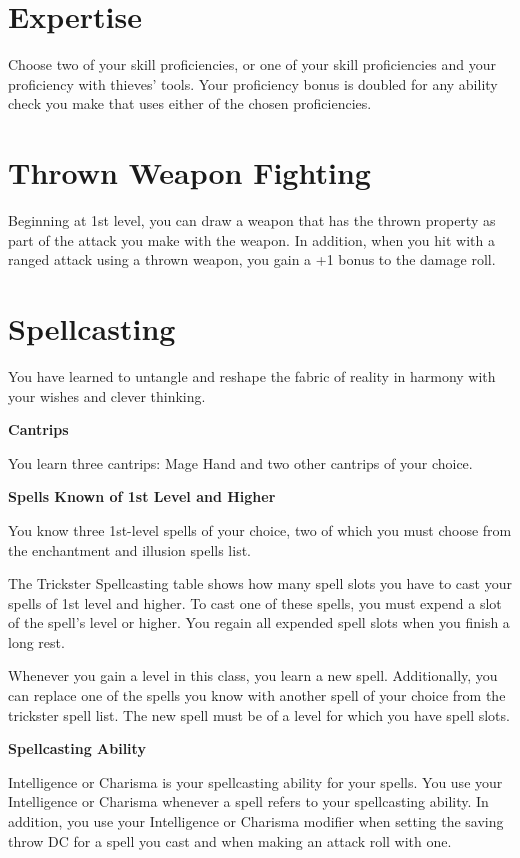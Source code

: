 \begin{multicols*}{2}
    
\section*{Expertise} 

Choose two of your skill proficiencies, or one of your skill proficiencies and your proficiency with thieves’ tools. Your proficiency bonus is doubled for any ability check you make that uses either of the chosen proficiencies.

\section*{Thrown Weapon Fighting}

Beginning at 1st level, you can draw a weapon that has the thrown property as part of the attack you make with the weapon.     In addition, when you hit with a ranged attack using a thrown weapon, you gain a +1 bonus to the damage roll.



\section*{Spellcasting}

You have learned to untangle and reshape the fabric of reality in harmony with your wishes and clever thinking.

\textbf{Cantrips}

You learn three cantrips: Mage Hand and two other cantrips of your choice. 


\textbf{Spells Known of 1st Level and Higher}

You know three 1st-level spells of your choice, two of which you must choose from the enchantment and illusion spells list.

The Trickster Spellcasting table shows how many spell slots you have to cast your spells of 1st level and higher. To cast one of these spells, you must expend a slot of the spell's level or higher. You regain all expended spell slots when you finish a long rest.


Whenever you gain a level in this class, you learn a new spell. Additionally, you can replace one of the spells you know with another spell of your choice from the trickster spell list. The new spell must be of a level for which you have spell slots.


\textbf{Spellcasting Ability}

Intelligence or Charisma is your spellcasting ability for your spells. You use your Intelligence or Charisma whenever a spell refers to your spellcasting ability. In addition, you use your Intelligence or Charisma modifier when setting the saving throw DC for a spell you cast and when making an attack roll with one.


\end{multicols*}
